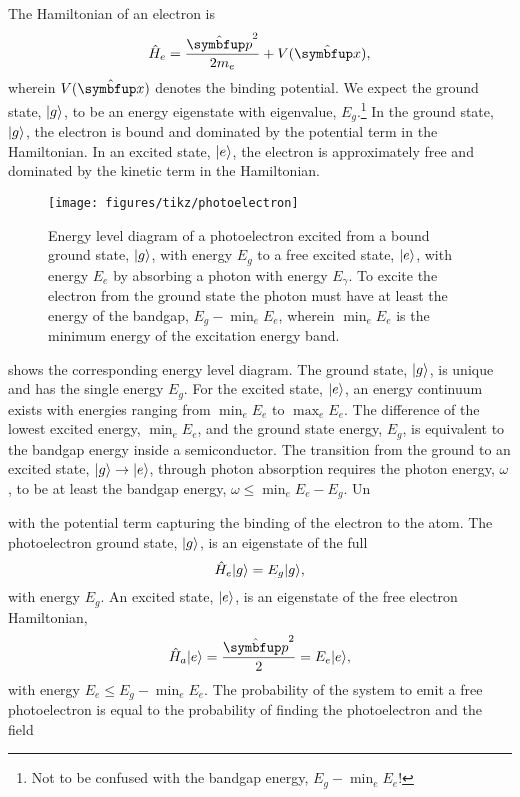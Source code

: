 The Hamiltonian of an electron is
\begin{equation}
	\hat{H}_e
	=
	\frac{\vu{p}^2}{2m_e}
	+
	V(\vu{x})
	,
\end{equation}
wherein $V(\vu{x})$ denotes the binding potential.
We expect the ground state, $\lvert g\rangle$, to be an energy eigenstate with eigenvalue, $E_g$.\footnote{Not to be confused with the bandgap energy, $E_g-\min_e E_e$!}
In the ground state, $\lvert g\rangle$, the electron is bound and dominated by the potential term in the Hamiltonian.
In an excited state, $\lvert e\rangle$, the electron is approximately free and dominated by the kinetic term in the Hamiltonian.
\begin{figure}[htb]
    \centering
    \texttt{[image: figures/tikz/photoelectron]}
    \caption{Energy level diagram of a photoelectron excited from a bound ground state, $\lvert g\rangle$, with energy $E_g$ to a free excited state, $\lvert e\rangle$, with energy $E_e$ by absorbing a photon with energy $E_\gamma$. To excite the electron from the ground state the photon must have at least the energy of the bandgap, $E_g-\min_eE_e$, wherein $\min_eE_e$ is the minimum energy of the excitation energy band.}\label{fig:photoelectron}
\end{figure}
 shows the corresponding energy level diagram.
The ground state, $\lvert g\rangle$, is unique and has the single energy $E_g$.
For the excited state, $\lvert e\rangle$, an energy continuum exists with energies ranging from $\min_eE_e$ to $\max_eE_e$.
The difference of the lowest excited energy, $\min_eE_e$, and the ground state energy, $E_g$, is equivalent to the bandgap energy inside a semiconductor.
The transition from the ground to an excited state, $\lvert g\rangle\to\lvert e\rangle$, through photon absorption requires the photon energy, $\omega$, to be at least the bandgap energy, $\omega\leq\min_eE_e-E_g$.
Un


with the potential term capturing the binding of the electron to the atom.
The photoelectron ground state, $\lvert g\rangle$, is an eigenstate of the full 
\begin{equation}
	\hat{H}_e
	\lvert g\rangle
	=
	E_g
	\lvert g\rangle
	,
\end{equation}
with energy $E_g$.
An excited state, $\lvert e\rangle$, is an eigenstate of the free electron Hamiltonian,
\begin{equation}
	\hat{H}_a
	\ket{e}
	=
	\frac{\vu{p}^2}{2}
	=
	E_e
	\ket{e}
	,
\end{equation}
with energy $E_e\leq E_g-\min_eE_e$.
The probability of the system to emit a free photoelectron is equal to the probability of finding the photoelectron and the field

